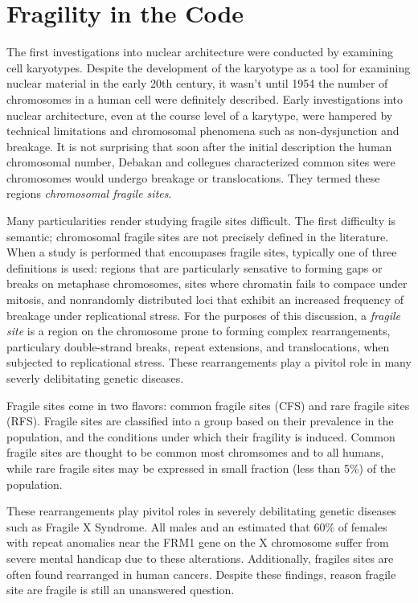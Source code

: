 \documentclass[phd,tocprelim]{cornell}
\begin{document}
\chapter{Fragility in the Code}

The first investigations into nuclear architecture were conducted by
examining cell karyotypes.  Despite the development of the karyotype as a
tool for examining nuclear material in the early 20th
century\cite{levitsky1924}, it wasn't until 1954 the number of chromosomes in
a human cell were definitely described\cite{tjio1956}.  Early investigations
into nuclear architecture, even at the course level of a karytype, were
hampered by technical limitations and chromosomal phenomena such as
non-dysjunction and breakage.  It is not surprising that soon after the
initial description the human chromosomal number, Debakan and collegues
characterized common sites were chromosomes would undergo breakage or
translocations.  They termed these regions
\textit{chromosomal fragile sites}\cite{leyden2008}.

Many particularities render studying fragile sites difficult.  The
first difficulty is semantic; chromosomal fragile sites are not precisely
defined in the literature.  When a study is performed that encompases fragile
sites, typically one of three definitions is used: regions that are particularly
sensative to forming gaps or breaks on metaphase chromosomes\cite{glover2005},
sites where chromatin fails to compace under mitosis\cite{leyden2008}, and
nonrandomly distributed loci that exhibit an increased frequency of breakage
under replicational stress\cite{franchitto2013}.  For the purposes of this
discussion, a \textit{fragile site} is a region on the chromosome prone to
forming complex rearrangements, particulary double-strand breaks, repeat
extensions, and translocations, when subjected to replicational stress.  These
rearrangements play a pivitol role in many severly delibitating genetic
diseases.

Fragile sites come in two flavors: common fragile sites (CFS) and rare fragile
sites (RFS).  Fragile sites are classified into a group based on their
prevalence in the population, and the conditions under which their fragility
is induced\cite{leyden2008}.  Common fragile sites are thought to be common
most chromsomes and to all humans, while rare fragile sites may be expressed
in small fraction (less than 5\%) of the population\cite{wells2006}.

  These
rearrangements play pivitol roles in severely debilitating genetic diseases
such as Fragile X Syndrome.  All males and an estimated that 60\% of females
with repeat anomalies near the FRM1 gene on the X chromosome suffer
from severe mental handicap due to these alterations\cite{sutherland1995}.
Additionally, fragiles sites are often found rearranged in human
cancers\cite{glover2005}.  Despite these findings, reason fragile site are
fragile is still an unanswered question.
\end{document}
